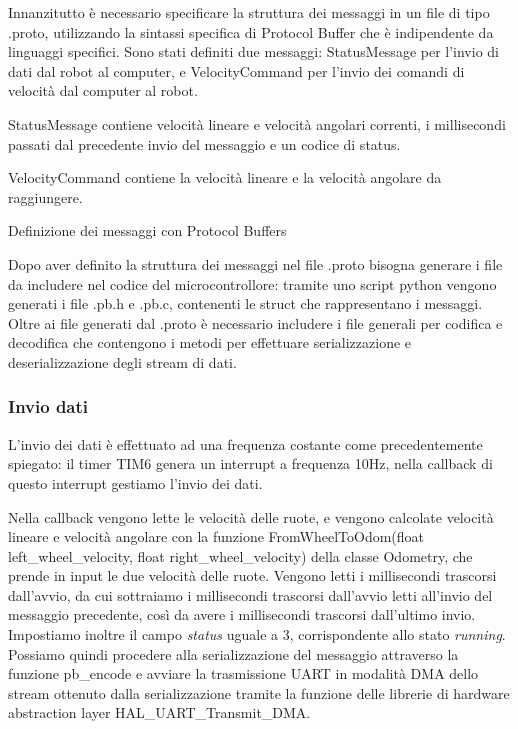 Innanzitutto è necessario specificare la struttura dei messaggi in un file di tipo .proto, utilizzando la sintassi specifica di Protocol Buffer che è indipendente da linguaggi specifici. Sono stati definiti due messaggi: StatusMessage per l'invio di dati dal robot al computer, e VelocityCommand per l'invio dei comandi di velocità dal computer al robot.

StatusMessage contiene velocità lineare e velocità angolari correnti, i millisecondi passati dal precedente invio del messaggio e un codice di status.

VelocityCommand contiene la velocità lineare e la velocità angolare da raggiungere.

\begin{listing}[ht]

\caption{Definizione dei messaggi con Protocol Buffers}
\label{listing:protobuf_definition}
\end{listing}


Dopo aver definito la struttura dei messaggi nel file .proto bisogna generare i file da includere nel codice del microcontrollore: tramite uno script python vengono generati i file .pb.h e .pb.c, contenenti le struct che rappresentano i messaggi. Oltre ai file generati dal .proto è necessario includere i file generali per codifica e decodifica che contengono i metodi per effettuare serializzazione e deserializzazione degli stream di dati.

\subsubsection{Invio dati}
L'invio dei dati è effettuato ad una frequenza costante come precedentemente spiegato: il timer TIM6 genera un interrupt a frequenza 10Hz, nella callback di questo interrupt gestiamo l'invio dei dati.

Nella callback vengono lette le velocità delle ruote, e vengono calcolate velocità lineare e velocità angolare con la funzione FromWheelToOdom(float left\_wheel\_velocity, float right\_wheel\_velocity) della classe Odometry, che prende in input le due velocità delle ruote. Vengono letti i millisecondi trascorsi dall'avvio, da cui sottraiamo i millisecondi trascorsi dall'avvio letti all'invio del messaggio precedente, così da avere i millisecondi trascorsi dall'ultimo invio. Impostiamo inoltre il campo \textit{status} uguale a 3, corrispondente allo stato \textit{running}.
Possiamo quindi procedere alla serializzazione del messaggio attraverso la funzione pb\_encode e avviare la trasmissione UART in modalità DMA dello stream ottenuto dalla serializzazione tramite la funzione delle librerie di hardware abstraction layer HAL\_UART\_Transmit\_DMA.

